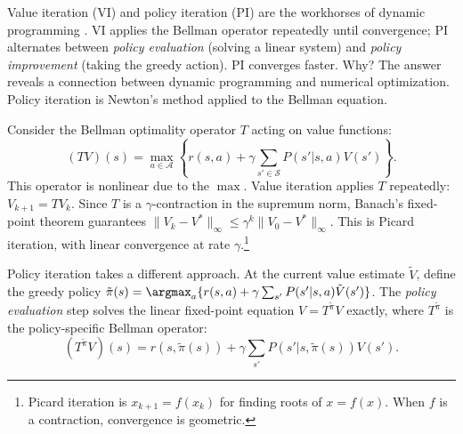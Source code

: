 Value iteration (VI) and policy iteration (PI) are the workhorses of dynamic programming \citep{StokeyLucas1989}. VI applies the Bellman operator repeatedly until convergence; PI alternates between \emph{policy evaluation} (solving a linear system) and \emph{policy improvement} (taking the greedy action). PI converges faster. Why? The answer reveals a connection between dynamic programming and numerical optimization. Policy iteration is Newton's method applied to the Bellman equation.

Consider the Bellman optimality operator $T$ acting on value functions:
\begin{equation}
(TV)(s) = \max_{a \in \mathcal{A}} \left\{ r(s,a) + \gamma \sum_{s' \in \mathcal{S}} P(s'|s,a) V(s') \right\}.
\label{eq:bellman_operator}
\end{equation}
This operator is nonlinear due to the $\max$. Value iteration applies $T$ repeatedly: $V_{k+1} = TV_k$. Since $T$ is a $\gamma$-contraction in the supremum norm, Banach's fixed-point theorem guarantees $\|V_k - V^*\|_\infty \leq \gamma^k \|V_0 - V^*\|_\infty$. This is Picard iteration, with linear convergence at rate $\gamma$.\footnote{Picard iteration is $x_{k+1} = f(x_k)$ for finding roots of $x = f(x)$. When $f$ is a contraction, convergence is geometric.}

Policy iteration takes a different approach. At the current value estimate $\tilde{V}$, define the greedy policy $\tilde{\pi}(s) = \argmax_a \{ r(s,a) + \gamma \sum_{s'} P(s'|s,a) \tilde{V}(s') \}$. The \emph{policy evaluation} step solves the linear fixed-point equation $V = T^{\tilde{\pi}} V$ exactly, where $T^{\tilde{\pi}}$ is the policy-specific Bellman operator:
\begin{equation}
(T^{\tilde{\pi}} V)(s) = r(s, \tilde{\pi}(s)) + \gamma \sum_{s'} P(s'|s,\tilde{\pi}(s)) V(s').
\end{equation}

